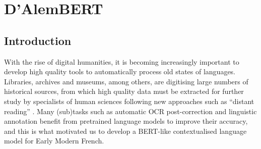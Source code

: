 \chapter{D'AlemBERT}





\section{Introduction}

With the rise of digital humanities, it is becoming increasingly important to develop high quality tools to automatically process old states of languages. Libraries, archives and museums, among others, are digitising large numbers of historical sources, from which high quality data must be extracted for further study by specialists of human sciences following new approaches such as ``distant reading'' \cite{moretti_distant_2013}. Many (sub)tasks such as automatic OCR post-correction \cite{rijhwani_lexically_2021} and linguistic annotation \cite{camps_corpus_2020} benefit from pretrained language models to improve their accuracy, and this is what motivated us to develop a BERT-like \cite{devlin-etal-2019-bert} contextualised language model for Early Modern French.

